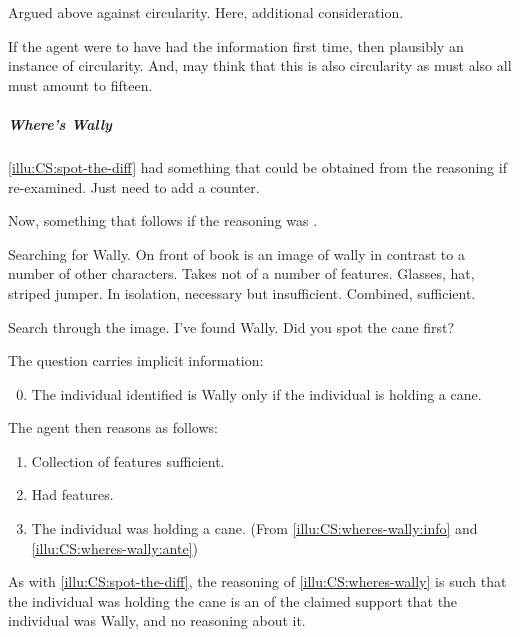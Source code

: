 \begin{note}
  Argued above against circularity.
  Here, additional consideration.

  If the agent were to have had the information first time, then plausibly an instance of circularity.
  And, may think that this is also circularity as must also all must amount to fifteen.
\end{note}

\subparagraph{Where's Wally}

\begin{note}
  \autoref{illu:CS:spot-the-diff} had something that could be obtained from the reasoning if re-examined.
  Just need to add a counter.

  Now, something that follows if the reasoning was \nmom{}.
\end{note}

\begin{note}
  \begin{illustration}
    \label{illu:CS:wheres-wally}
    Searching for Wally.
    On front of book is an image of wally in contrast to a number of other characters.
    Takes not of a number of features.
    Glasses, hat, striped jumper.
    In isolation, necessary but insufficient.
    Combined, sufficient.

    Search through the image.
    I've found Wally.
    Did you spot the cane first?

    The question carries implicit information:
    \begin{enumerate}[label=\arabic*., ref=(I\ref{illu:CS:wheres-wally}.\arabic*)]
      \setcounter{enumi}{-1}
    \item\label{illu:CS:wheres-wally:info} The individual identified is Wally only if the individual is holding a cane.
    \end{enumerate}

    The agent then reasons as follows:

    \begin{enumerate}[label=\arabic*., ref=(I\ref{illu:CS:wheres-wally}.\arabic*), resume]
    \item Collection of features sufficient.
    \item\label{illu:CS:wheres-wally:ante} Had features.
    \item The individual was holding a cane. \hfill (From \ref{illu:CS:wheres-wally:info} and \ref{illu:CS:wheres-wally:ante})
    \end{enumerate}
  \end{illustration}

  As with \autoref{illu:CS:spot-the-diff}, the reasoning of \autoref{illu:CS:wheres-wally} is such that the individual was holding the cane is an \requ{} of the claimed support that the individual was Wally, and no reasoning about it.
\end{note}

